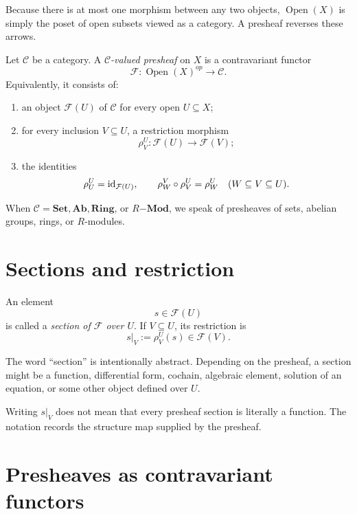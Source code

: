 Because there is at most one morphism between any two objects, $\operatorname{Open}(X)$ is
simply the poset of open subsets viewed as a category.  A presheaf reverses these arrows.



\begin{definition}[Presheaf]
Let $\mathcal C$ be a category.  A \emph{$\mathcal C$-valued presheaf} on $X$ is a
contravariant functor
\[
\mathcal F:\operatorname{Open}(X)^{op}\longrightarrow\mathcal C.
\]
Equivalently, it consists of:
\begin{enumerate}
\item an object $\mathcal F(U)$ of $\mathcal C$ for every open $U\subseteq X$;
\item for every inclusion $V\subseteq U$, a restriction morphism
\[
\rho^U_V:\mathcal F(U)\longrightarrow\mathcal F(V);
\]
\item the identities
\[
\rho^U_U=\operatorname{id}_{\mathcal F(U)},
\qquad
\rho^V_W\circ\rho^U_V=\rho^U_W
\quad(W\subseteq V\subseteq U).
\]
\end{enumerate}
\end{definition}

When $\mathcal C=\mathbf{Set},\mathbf{Ab},\mathbf{Ring}$, or $R\mathbf{-Mod}$, we speak of
presheaves of sets, abelian groups, rings, or $R$-modules.



\section{Sections and restriction}

An element
\[
s\in\mathcal F(U)
\]
is called a \emph{section of $\mathcal F$ over $U$}.  If $V\subseteq U$, its restriction is
\[
s|_V:=\rho^U_V(s)\in\mathcal F(V).
\]

The word ``section'' is intentionally abstract.  Depending on the presheaf, a section might
be a function, differential form, cochain, algebraic element, solution of an equation, or
some other object defined over $U$.

\begin{remark}
Writing $s|_V$ does not mean that every presheaf section is literally a function.  The
notation records the structure map supplied by the presheaf.
\end{remark}

\section{Presheaves as contravariant functors}

